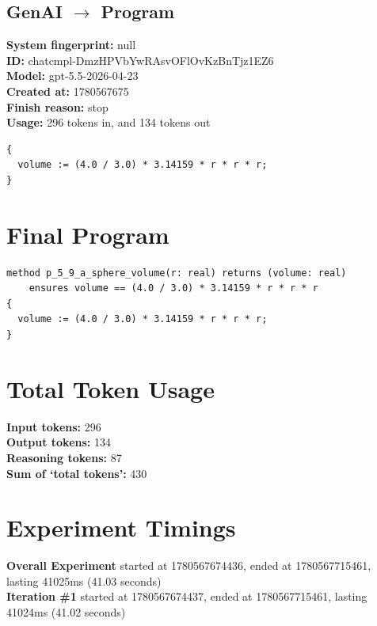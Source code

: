 \documentclass{article}
\begin{document}
\subsection*{GenAI $\rightarrow$ Program}
\textbf{System fingerprint: }null
\\\textbf{ID: }chatcmpl-DmzHPVbYwRAsvOFlOvKzBnTjz1EZ6
\\\textbf{Model: }gpt-5.5-2026-04-23
\\\textbf{Created at: }1780567675
\\\textbf{Finish reason: }stop
\\\textbf{Usage: }296 tokens in, and 134 tokens out
\begin{lstlisting}
{
  volume := (4.0 / 3.0) * 3.14159 * r * r * r;
}
\end{lstlisting}
\section*{Final Program}
\begin{lstlisting}
method p_5_9_a_sphere_volume(r: real) returns (volume: real)
	ensures volume == (4.0 / 3.0) * 3.14159 * r * r * r
{
  volume := (4.0 / 3.0) * 3.14159 * r * r * r;
}
\end{lstlisting}
\section*{Total Token Usage}
\textbf{Input tokens: }296
\\\textbf{Output tokens: }134
\\\textbf{Reasoning tokens: }87
\\\textbf{Sum of `total tokens': }430
\section*{Experiment Timings}
\textbf{Overall Experiment} started at 1780567674436, ended at 1780567715461, lasting 41025ms (41.03 seconds)
\\\textbf{Iteration \#1} started at 1780567674437, ended at 1780567715461, lasting 41024ms (41.02 seconds)
\end{document}

